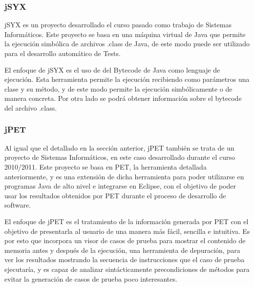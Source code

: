 \subsubsection{jSYX}

jSYX es un proyecto desarrollado el curso pasado como trabajo de Sistemas Inform\'aticos. Este proyecto se basa en una m\'aquina virtual de Java que permite la ejecuci\'on simb\'olica de archivos .class de Java, de este modo puede ser utilizado para el desarrollo autom\'atico de Tests. 

El enfoque de jSYX es el uso de del Bytecode de Java como lenguaje de ejecuci\'on. Esta herramienta permite la ejecuci\'on recibiendo como par\'ametros una clase y su m\'etodo, y de este modo permite la ejecuci\'on simb\'olicamente o de manera concreta. Por otra lado se podr\'a obtener informaci\'on sobre el bytecode del archivo .class.

\subsubsection{jPET}

Al igual que el detallado en la secci\'on anterior, jPET tambi\'en se trata de un proyecto de Sistemas Inform\'aticos, en este caso desarrollado durante el curso 2010/2011. Este proyecto se basa en PET, la herramienta detallada anteriormente, y es una extensi\'on de dicha herramienta para poder utilizarse en programas Java de alto nivel e integrarse en Eclipse, con el objetivo de poder usar los resultados obtenidos por PET durante el proceso de desarrollo de software.

El enfoque de jPET es el tratamiento de la informaci\'on generada por PET con el objetivo de presentarla al usuario de una manera m\'as f\'acil, sencilla e intuitiva. Es por esto que incorpora un visor de casos de prueba para mostrar el contenido de memoria antes y despu\'es de la ejecuci\'on, una herramienta de depuraci\'on, para ver los resultados mostrando la secuencia de instrucciones que el caso de prueba ejecutar\'ia, y es capaz de analizar sint\'acticamente precondiciones de m\'etodos para evitar la generaci\'on de casos de prueba poco interesantes.


